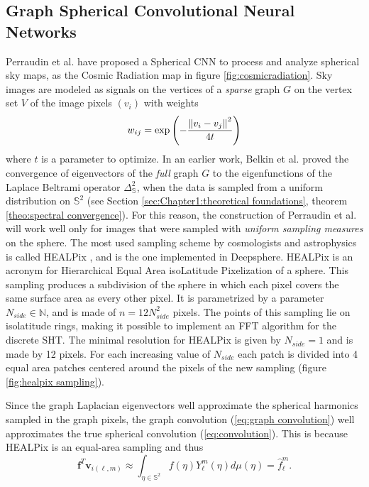 \subsection{Graph Spherical Convolutional Neural Networks} \label{sec:Chapter1:DeepSphere}
Perraudin et al. \cite{DeepSphere} have proposed a Spherical CNN to process and analyze spherical sky maps, as the Cosmic Radiation map in figure \ref{fig:cosmicradiation}. Sky images are modeled as signals on the vertices of a \textit{sparse} graph $G$ on the vertex set $V$ of the image pixels $(v_i)$ with weights
$$
w_{ij}=\exp \left(-\frac{\left\lVert v_i-v_j\right\rVert^2}{4t}\right)
$$
where $t$ is a parameter to optimize. In an earlier work, Belkin et al. \cite{NIPS2006_2989} proved the convergence of eigenvectors of the \textit{full} graph $G$ to the eigenfunctions of the Laplace Beltrami operator $\Delta_\mathbb S^2$, when the data is sampled from a uniform distribution on $\mathbb S^2$ (see Section \ref{sec:Chapter1:theoretical foundations}, theorem \ref{theo:spectral convergence}). For this reason, the construction of Perraudin et al. will work well only for images that were sampled with \textit{uniform sampling measures} on the sphere. The most used sampling scheme by cosmologists and astrophysics is called HEALPix \cite{HEALPix}, and is the one implemented in Deepsphere. HEALPix is an acronym for Hierarchical Equal Area isoLatitude Pixelization of a sphere. This sampling produces a subdivision of the sphere in which each pixel covers the same surface area as every other pixel. It is parametrized by a parameter $N_{side}\in\mathbb N$, and is made of $n=12N_{side}^2$ pixels. The points of this sampling lie on isolatitude rings, making it possible to implement an FFT algorithm for the discrete SHT. The minimal resolution for HEALPix is given by $N_{side}=1$ and is made by 12 pixels. For each increasing value of $N_{side}$ each patch is divided into 4 equal area patches centered around the pixels of the new sampling (figure \ref{fig:healpix sampling}).

Since the graph Laplacian eigenvectors well approximate the spherical harmonics sampled in the graph pixels, the graph convolution (\ref{eq:graph convolution}) well approximates the true spherical convolution (\ref{eq:convolution}). This is because HEALPix is an equal-area sampling and thus
\begin{equation}\label{eq:approx}
\mathbf f^T\mathbf v_{i(\ell, m)} \approx \int_{\eta \in \mathbb S^2}f(\eta)Y_\ell^m(\eta)d\mu(\eta)=\hat f_\ell^m.
\end{equation}

